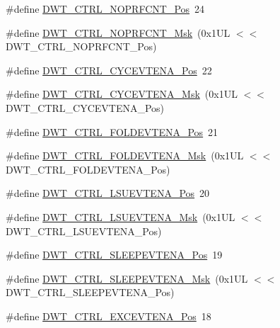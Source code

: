 \begin{DoxyCompactItemize}
\item 
\#define \hyperlink{group___c_m_s_i_s___d_w_t_gad52a0e5be84363ab166cc17beca0d048}{D\+W\+T\+\_\+\+C\+T\+R\+L\+\_\+\+N\+O\+P\+R\+F\+C\+N\+T\+\_\+\+Pos}~24
\item 
\#define \hyperlink{group___c_m_s_i_s___d_w_t_gafd8448d7db4bc51f27f202e6e1f27823}{D\+W\+T\+\_\+\+C\+T\+R\+L\+\_\+\+N\+O\+P\+R\+F\+C\+N\+T\+\_\+\+Msk}~(0x1\+U\+L $<$$<$ D\+W\+T\+\_\+\+C\+T\+R\+L\+\_\+\+N\+O\+P\+R\+F\+C\+N\+T\+\_\+\+Pos)
\item 
\#define \hyperlink{group___c_m_s_i_s___d_w_t_ga0cb0640aaeb18a626d7823570d5c3cb6}{D\+W\+T\+\_\+\+C\+T\+R\+L\+\_\+\+C\+Y\+C\+E\+V\+T\+E\+N\+A\+\_\+\+Pos}~22
\item 
\#define \hyperlink{group___c_m_s_i_s___d_w_t_ga40554bd81460e39abf08810f45fac1a2}{D\+W\+T\+\_\+\+C\+T\+R\+L\+\_\+\+C\+Y\+C\+E\+V\+T\+E\+N\+A\+\_\+\+Msk}~(0x1\+U\+L $<$$<$ D\+W\+T\+\_\+\+C\+T\+R\+L\+\_\+\+C\+Y\+C\+E\+V\+T\+E\+N\+A\+\_\+\+Pos)
\item 
\#define \hyperlink{group___c_m_s_i_s___d_w_t_ga5602b0707f446ce78d88ff2a3a82bfff}{D\+W\+T\+\_\+\+C\+T\+R\+L\+\_\+\+F\+O\+L\+D\+E\+V\+T\+E\+N\+A\+\_\+\+Pos}~21
\item 
\#define \hyperlink{group___c_m_s_i_s___d_w_t_ga717e679d775562ae09185a3776b1582f}{D\+W\+T\+\_\+\+C\+T\+R\+L\+\_\+\+F\+O\+L\+D\+E\+V\+T\+E\+N\+A\+\_\+\+Msk}~(0x1\+U\+L $<$$<$ D\+W\+T\+\_\+\+C\+T\+R\+L\+\_\+\+F\+O\+L\+D\+E\+V\+T\+E\+N\+A\+\_\+\+Pos)
\item 
\#define \hyperlink{group___c_m_s_i_s___d_w_t_gaea5d1ee72188dc1d57b54c60a9f5233e}{D\+W\+T\+\_\+\+C\+T\+R\+L\+\_\+\+L\+S\+U\+E\+V\+T\+E\+N\+A\+\_\+\+Pos}~20
\item 
\#define \hyperlink{group___c_m_s_i_s___d_w_t_gac47427f455fbc29d4b6f8a479169f2b2}{D\+W\+T\+\_\+\+C\+T\+R\+L\+\_\+\+L\+S\+U\+E\+V\+T\+E\+N\+A\+\_\+\+Msk}~(0x1\+U\+L $<$$<$ D\+W\+T\+\_\+\+C\+T\+R\+L\+\_\+\+L\+S\+U\+E\+V\+T\+E\+N\+A\+\_\+\+Pos)
\item 
\#define \hyperlink{group___c_m_s_i_s___d_w_t_ga9c6d62d121164013a8e3ee372f17f3e5}{D\+W\+T\+\_\+\+C\+T\+R\+L\+\_\+\+S\+L\+E\+E\+P\+E\+V\+T\+E\+N\+A\+\_\+\+Pos}~19
\item 
\#define \hyperlink{group___c_m_s_i_s___d_w_t_ga2f431b3734fb840daf5b361034856da9}{D\+W\+T\+\_\+\+C\+T\+R\+L\+\_\+\+S\+L\+E\+E\+P\+E\+V\+T\+E\+N\+A\+\_\+\+Msk}~(0x1\+U\+L $<$$<$ D\+W\+T\+\_\+\+C\+T\+R\+L\+\_\+\+S\+L\+E\+E\+P\+E\+V\+T\+E\+N\+A\+\_\+\+Pos)
\item 
\#define \hyperlink{group___c_m_s_i_s___d_w_t_gaf4e73f548ae3e945ef8b1d9ff1281544}{D\+W\+T\+\_\+\+C\+T\+R\+L\+\_\+\+E\+X\+C\+E\+V\+T\+E\+N\+A\+\_\+\+Pos}~18
$$
\end{DoxyCompactItemize}
